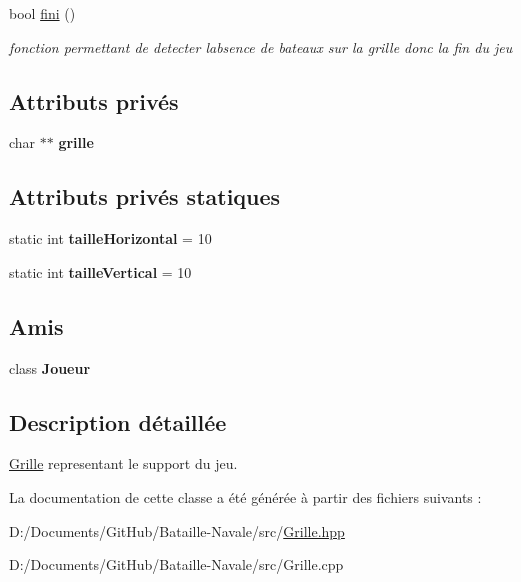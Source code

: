 \begin{DoxyCompactItemize}
\mbox{\label{class_grille_af22b526602ad163f6e6f7f7c8f486aa2}} 
bool \mbox{\hyperlink{class_grille_af22b526602ad163f6e6f7f7c8f486aa2}{fini}} ()
\begin{DoxyCompactList}\small\item\em fonction permettant de detecter l\textquotesingle{}absence de bateaux sur la grille donc la fin du jeu \end{DoxyCompactList}\end{DoxyCompactItemize}
\subsection*{Attributs privés}
\begin{DoxyCompactItemize}
\item 
\mbox{\label{class_grille_abd4bc59ff38259962e5d8d3c18d1ae6b}} 
char $\ast$$\ast$ {\bfseries grille}
\end{DoxyCompactItemize}
\subsection*{Attributs privés statiques}
\begin{DoxyCompactItemize}
\item 
\mbox{\label{class_grille_aa7cfe2eeb6fc29990dd4be1b329d6b59}} 
static int {\bfseries taille\+Horizontal} = 10
\item 
\mbox{\label{class_grille_ae621c3c7d27681684eea959403beb4f9}} 
static int {\bfseries taille\+Vertical} = 10
\end{DoxyCompactItemize}
\subsection*{Amis}
\begin{DoxyCompactItemize}
\item 
\mbox{\label{class_grille_aa7383e9c02af27ebd2d9d65053e899ce}} 
class {\bfseries Joueur}
\end{DoxyCompactItemize}


\subsection{Description détaillée}
\mbox{\hyperlink{class_grille}{Grille}} representant le support du jeu. 

La documentation de cette classe a été générée à partir des fichiers suivants \+:\begin{DoxyCompactItemize}
\item 
D\+:/\+Documents/\+Git\+Hub/\+Bataille-\/\+Navale/src/\mbox{\hyperlink{_grille_8hpp}{Grille.\+hpp}}\item 
D\+:/\+Documents/\+Git\+Hub/\+Bataille-\/\+Navale/src/Grille.\+cpp\end{DoxyCompactItemize}

